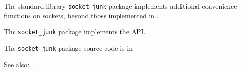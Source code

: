 
The standard library {\tt socket\_junk} package implements additional convenience functions on sockets, beyond those implemented in  .

The {\tt socket\_junk} package implements the  API.

The {\tt socket\_junk} package source code is in .

See also: .
